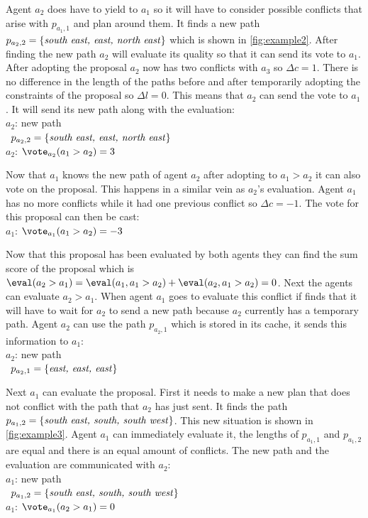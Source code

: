 Agent $a_2$ does have to yield to $a_1$ so it will have to consider possible 
conflicts that arise with $p_{a_1,1}$ and plan around them. It finds a new path 
$p_{a_2,2} = \{\text{\emph{south east, east, north east}}\}$ which is shown in 
\autoref{fig:example2}. After finding the new path $a_2$ will evaluate its 
quality so that it can send its vote to $a_1$. After adopting the proposal 
$a_2$ now has two conflicts with $a_3$ so $\Delta c = 1$. There is no 
difference in the length of the paths before and after temporarily adopting the 
constraints of the proposal so $\Delta l = 0$. This means that $a_2$ can send 
the vote to $a_1$. It will send its new path along with the evaluation:
\\ \-\qquad $a_2$: new path
\\ \-\qquad\quad\,\; $p_{a_2,2} = \{\text{\emph{south east, east, north 
east}}\}$
\\ \-\qquad $a_2$: $\vote_{a_2}(a_1 > a_2) = 3$

Now that $a_1$ knows the new path of agent $a_2$ after adopting to $a_1 > a_2$
it can also vote on the proposal. This happens in a similar vein as $a_2$'s
evaluation. Agent $a_1$ has no more conflicts while it had one previous 
conflict so $\Delta c = -1$. The vote for this proposal can then be cast:
\\ \-\qquad $a_1$: $\vote_{a_1}(a_1 > a_2) = -3$

Now that this proposal has been evaluated by both agents they can find the sum
score of the proposal which is $\eval(a_2 > a_1) = \eval(a_1, a_1 > a_2) +
\eval(a_2, a_1 > a_2) = 0$. Next the agents can evaluate $a_2 > a_1$. When 
agent $a_1$ goes to evaluate this conflict if finds that it will have to wait 
for $a_2$ to send a new path because $a_2$ currently has a temporary path. 
Agent $a_2$ can use the path $p_{a_2,1}$ which is stored in its cache, it sends 
this information to $a_1$:
\\ \-\qquad $a_2$: new path
\\ \-\qquad\quad\,\; $p_{a_2,1} = \{\text{\emph{east, east, east}}\}$

Next $a_1$ can evaluate the proposal. First it needs to make a new plan that 
does not conflict with the path that $a_2$ has just sent. It finds the path 
$p_{a_1,2} = \{\text{\emph{south east, south, south west}}\}$. This new 
situation is shown in \autoref{fig:example3}. Agent $a_1$ can immediately 
evaluate it, the lengths of $p_{a_1,1}$ and $p_{a_1,2}$ are equal and there is 
an equal amount of conflicts. The new path and the evaluation are communicated 
with $a_2$:
\\ \-\qquad $a_1$: new path
\\ \-\qquad\quad\,\; $p_{a_1,2} = \{\text{\emph{south east, south, south 
west}}\}$
\\ \-\qquad $a_1$: $\vote_{a_1}(a_2 > a_1) = 0$

